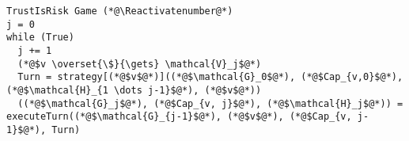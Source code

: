 {}
\Suppressnumber
\begin{lstlisting}[label=trustisriskgame, style=numbers]
TrustIsRisk Game (*@\Reactivatenumber@*)
j = 0
while (True)
  j += 1
  (*@$v \overset{\$}{\gets} \mathcal{V}_j$@*)
  Turn = strategy[(*@$v$@*)]((*@$\mathcal{G}_0$@*), (*@$Cap_{v,0}$@*), (*@$\mathcal{H}_{1 \dots j-1}$@*), (*@$v$@*))
  ((*@$\mathcal{G}_j$@*), (*@$Cap_{v, j}$@*), (*@$\mathcal{H}_j$@*)) = executeTurn((*@$\mathcal{G}_{j-1}$@*), (*@$v$@*), (*@$Cap_{v, j-1}$@*), Turn)
\end{lstlisting}
